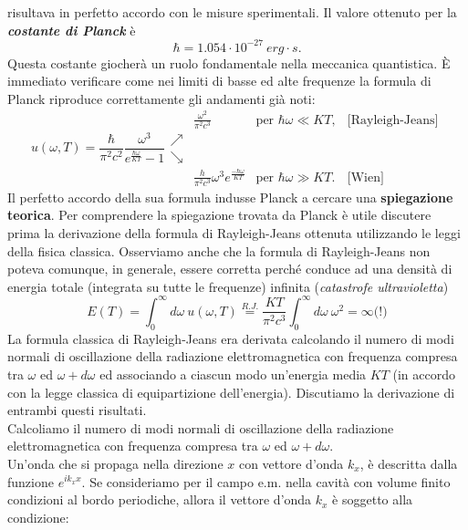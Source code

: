 risultava in perfetto accordo con le misure sperimentali. Il valore ottenuto per la \textbf{\textit{costante di Planck}} è
\[ \hbar = 1.054 \cdot 10^{-27} \ erg\cdot s.\]
Questa costante giocherà un ruolo fondamentale nella meccanica quantistica.
È immediato verificare come nei limiti di basse ed alte frequenze la formula di Planck riproduce correttamente gli andamenti già noti:\\
\begin{equation}
u(\omega , T) =\frac{\hbar}{\pi ^2 c^2} \frac{\omega ^3}{e^{\frac{\hbar \omega}{KT}} -1} 
\begin{array}{clcc}
 & \displaystyle{\frac{\omega ^2}{\pi ^2 c^3} } & \textrm{per } \hbar \omega \ll KT, & \textrm{[Rayleigh-Jeans]}\\
\nearrow \\
\searrow \\
 & \displaystyle{\frac{h}{\pi ^2 c^3}\omega ^3 e^{\frac{-\hbar \omega}{KT}}} & \textrm{per }  \hbar \omega \gg KT .& \textrm{[Wien]}
\end{array}
\end{equation}
Il perfetto accordo della sua formula indusse Planck a cercare una \textbf{spiegazione teorica}. Per comprendere la spiegazione trovata da Planck è utile discutere prima la derivazione della formula di Rayleigh-Jeans ottenuta utilizzando le leggi della fisica classica. Osserviamo anche che la formula di  Rayleigh-Jeans non poteva comunque, in generale, essere corretta perché conduce ad una densità di energia totale (integrata su tutte le frequenze) infinita (\textit{catastrofe ultravioletta})
\begin{equation}
E(T) = \int _0 ^\infty d\omega\ u(\omega , T) \overset{R.J.}{=} \frac{KT}{\pi ^2 c ^3}\int _0 ^\infty d\omega \ \omega ^2 = \infty \textrm{(!)}
\end{equation}
La formula classica di Rayleigh-Jeans era derivata calcolando il numero di modi normali di oscillazione della radiazione elettromagnetica con frequenza compresa tra $\omega$ ed $\omega + d\omega$ ed associando a ciascun modo un'energia media $KT$ (in accordo con la legge classica di equipartizione dell'energia). Discutiamo la derivazione di entrambi questi risultati.\\
Calcoliamo il numero di modi normali di oscillazione della radiazione elettromagnetica con frequenza compresa tra $\omega$ ed $\omega + d\omega$. \\
Un'onda che si propaga nella direzione $x$ con vettore d'onda $k_x$, è descritta dalla funzione $e^{ik_x x}$. Se consideriamo per il campo e.m. nella cavità con volume finito condizioni al bordo periodiche, allora il vettore d'onda $k_x$ è soggetto alla condizione:
